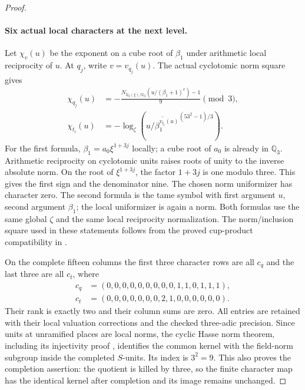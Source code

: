 \begin{proof}
\paragraph{Six actual local characters at the next level.}
Let $\chi_v(u)$ be the exponent on a cube root of $\beta_1$
under arithmetic local reciprocity of $u$.
At $q_j$, write $v=v_{q_j}(u)$. The actual cyclotomic norm square
gives
\[
 \begin{aligned}
 \chi_{q_j}(u)&=-\frac{
  N_{\mathbb Q_3(\xi)/\mathbb Q_3}
       (u/(\beta_1+1)^v)-1}{9}\pmod3,\\
 \chi_{t_i}(u)&=-\log_\zeta
       \left(\overline{u/\beta_1^{v_{t_i}(u)}}^{(53^2-1)/3}\right).
 \end{aligned}
 \tag{E119.22}
\]
For the first formula, $\beta_1=a_0\xi^{1+3j}$ locally;
a cube root of $a_0$ is already in $\mathbb Q_3$.
Arithmetic reciprocity on cyclotomic units raises roots of unity
to the inverse absolute norm. On the root of $\xi^{1+3j}$,
the factor $1+3j$ is one modulo three. This gives the first
sign and the denominator nine. The chosen norm uniformizer
has character zero. The second formula is the tame symbol
with first argument $u$, second argument $\beta_1$;
the local uniformizer is again a norm. Both formulas use
the same global $\zeta$ and the same local reciprocity normalization.
The norm/inclusion square used in these statements follows from
the proved cup-product compatibility in
\cite[III,Theorem3.1]{E_MilneCFT}.

On the complete fifteen columns the first three character rows
are all $c_q$ and the last three are all $c_t$, where
\[
 \begin{aligned}
 c_q&=(0,0,0,0,0,0,0,0,0,1,1,0,1,1,1),\\
 c_t&=(0,0,0,0,0,0,0,2,1,0,0,0,0,0,0).
 \end{aligned}
\]
Their rank is exactly two and their column sums are zero.
All entries are retained with their local valuation corrections
and the checked three-adic precision. Since units at unramified
places are local norms, the cyclic Hasse norm theorem, including
its injectivity proof \cite[VIII,Theorem3.1]{E_MilneCFT}, identifies
the common kernel with the field-norm subgroup inside the
completed $S$-units. Its index is $3^2=9$.
This also proves the completion assertion: the quotient is
killed by three, so the finite character map has the identical
kernel after completion and its image remains unchanged.


\end{proof}
